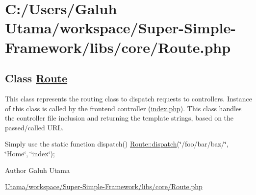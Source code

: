 \hypertarget{_c_1_2_users_2_galuh_01_utama_2workspace_2_super-_simple-_framework_2libs_2core_2_route_8php-example}{\section{\-C\-:/\-Users/\-Galuh Utama/workspace/\-Super-\/\-Simple-\/\-Framework/libs/core/\-Route.\-php}
}
\subsection*{\-Class \hyperlink{class_route}{\-Route}}

\-This class represents the routing class to dispatch requests to controllers. \-Instance of this class is called by the frontend controller (\hyperlink{index_8php_source}{index.\-php}). \-This class handles the controller file inclusion and returning the template strings, based on the passed/called \-U\-R\-L.

\-Simply use the static function dispatch() {\ttfamily  \hyperlink{class_route_ad563c937ff9e2e8ebc7f4501662c389d}{\-Route\-::dispatch}(\char`\"{}/foo/bar/baz/\char`\"{}, \char`\"{}\-Home\char`\"{}, \char`\"{}index\char`\"{}); }

\begin{DoxyAuthor}{\-Author}
\-Galuh \-Utama
\end{DoxyAuthor}

\begin{DoxyCodeInclude}
\end{DoxyCodeInclude}
 \hyperlink{_route_8php_source}{\-Utama/workspace/\-Super-\/\-Simple-\/\-Framework/libs/core/\-Route.\-php} 